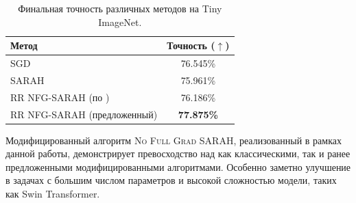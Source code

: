 \begin{table}[H]
\centering
\caption{Финальная точность различных методов на Tiny ImageNet.}
\label{tab:vit}
\begin{tabular}{l|c}
\toprule
Метод & Точность ($\uparrow$) \\
\midrule
\textsc{SGD} & 76.545\% \\
\textsc{SARAH} & 75.961\% \\
\textsc{RR NFG-SARAH} (по \cite{beznosikov2023random}) & 76.186\% \\
\textsc{RR NFG-SARAH} (предложенный) & \textbf{77.875\%} \\
\bottomrule
\end{tabular}
\end{table}

Модифицированный алгоритм \textsc{No Full Grad SARAH}, реализованный в рамках данной работы, демонстрирует превосходство над как классическими, так и ранее предложенными модифицированными алгоритмами. Особенно заметно улучшение в задачах с большим числом параметров и высокой сложностью модели, таких как Swin Transformer.

